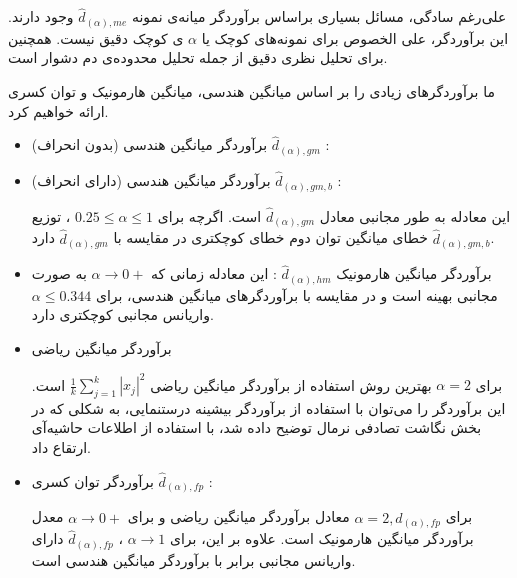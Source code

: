 علی‌رغم سادگی، مسائل بسیاری براساس برآوردگر میانه‌ی نمونه
$\hat{d}_{(\alpha), me}$
وجود دارند. این برآوردگر، علی الخصوص برای نمونه‌های کوچک یا 
$\alpha$
ی کوچک دقیق نیست. همچنین برای تحلیل نظری دقیق از جمله تحلیل محدوده‌ی دم دشوار است.

ما برآوردگرهای زیادی را بر اساس میانگین هندسی، میانگین هارمونیک و توان کسری ارائه خواهیم کرد.

\begin{itemize}
\item
برآوردگر میانگین هندسی (بدون انحراف) 
$\hat{d}_{(\alpha),gm}$
:
\item
برآوردگر میانگین هندسی (دارای انحراف) 
$\hat{d}_{(\alpha),gm,b}$
:

این معادله به طور مجانبی معادل
$\hat{d}_{(\alpha),gm}$
است. اگرچه برای 
$0.25 \leq \alpha \leq 1$
، توزیع
$\hat{d}_{(\alpha),gm,b}$
خطای میانگین توان دوم خطای کوچکتری در مقایسه با
$\hat{d}_{(\alpha),gm}$
دارد.
\item
برآوردگر میانگین هارمونیک 
$\hat{d}_{(\alpha),hm}$
:
این معادله زمانی که 
$\alpha \rightarrow 0+$
به صورت مجانبی بهینه است و در مقایسه با برآوردگرهای میانگین هندسی، برای 
$\alpha \leq 0.344$
واریانس مجانبی کوچکتری دارد.

\item
برآوردگر میانگین ریاضی

برای 
$\alpha = 2$
بهترین روش استفاده از برآوردگر میانگین ریاضی 
$\frac{1}{k} \sum_{j=1}^k \left| x_j \right|^2$
است. این برآوردگر را می‌توان با استفاده از برآوردگر بیشینه درستنمایی، به شکلی که در بخش نگاشت تصادفی نرمال توضیح داده شد، با استفاده از اطلاعات حاشیه‌آی ارتقاع داد.
\item
برآوردگر توان کسری
$\hat{d}_{(\alpha),fp}$
:

برای 
$\alpha = 2, \hat{d}_{(\alpha), fp}$
معادل برآوردگر میانگین ریاضی و برای 
$\alpha \rightarrow 0+$
معدل برآوردگر میانگین هارمونیک است. علاوه بر این، برای 
$\alpha \rightarrow 1$
،
$\hat{d}_{(\alpha),fp}$
دارای واریانس مجانبی برابر با برآوردگر میانگین هندسی است.
\end{itemize}

\bigskip























